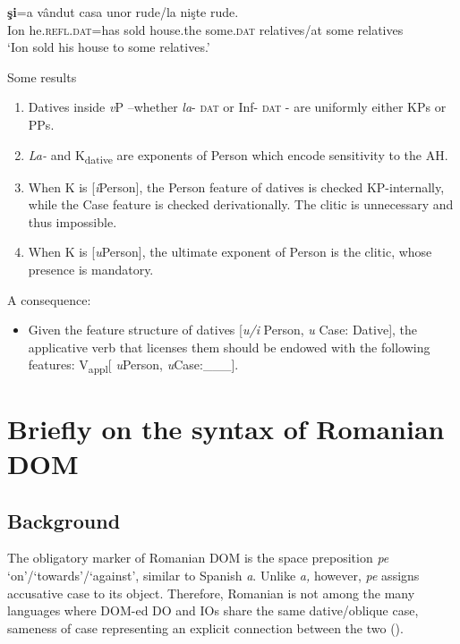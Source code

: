 \documentclass[output=paper,modfonts,nonflat,newtxmath]{langsci/langscibook}
\begin{document}
\ea%
      \label{ex:cornilescu:18}
       \textbf{{şi}}{=a} {vândut} {casa} {unor} rude/la {nişte} {rude}.\\
           Ion he.\textsc{refl}.\textsc{dat}=has sold house.the some.\textsc{dat} relatives/{at} some relatives \\
      \glt ‘Ion sold his house to some relatives.’
   \z


 {Some} {results}
\begin{enumerate}
	\item Datives inside \textit{v}P –whether \textit{la}{}- \textsc{dat} or Inf- \textsc{dat} - are uniformly either KPs or PPs.
	\item \textit{La-} and K\textsubscript{dative} are exponents of Person which encode sensitivity to the AH.
	\item When K is [\textit{i}Person], the Person feature of datives is checked KP-internally, while the Case feature is checked derivationally. The clitic is unnecessary and thus impossible.
	\item When K is [\textit{u}Person], the ultimate exponent of Person is the clitic, whose presence is mandatory.
\end{enumerate}

 A consequence: 
 \begin{itemize}
	\item Given the feature structure of datives [\textit{u/i} Person, \textit{u} Case: Dative], the applicative verb that licenses them should be endowed with the following features: V\textsubscript{appl}[ \textit{u}Person, \textit{u}Case:\_\_\_].
\end{itemize}

\section{Briefly on the syntax of Romanian DOM} %

\subsection{{Background}}

The obligatory marker of Romanian DOM is the space preposition \textit{pe} ‘on’/‘towards’/‘against’, similar to Spanish \textit{a}. Unlike \textit{a,} however, \textit{pe} assigns accusative case to its object. Therefore, Romanian is not among the many languages where DOM-ed DO and IOs share the same dative/oblique case, sameness of case representing an explicit connection between the two (\citealt{ManziniFranco2016}).
\end{document}
